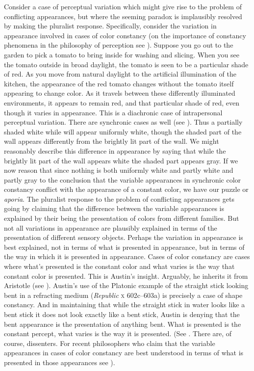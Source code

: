 \documentclass[12pt]{article}
\begin{document}
Consider a case of perceptual variation which might give rise to the problem of conflicting appearances, but where the seeming paradox is implausibly resolved by making the pluralist response. Specifically, consider the variation in appearance involved in cases of color constancy (on the importance of constancy phenomena in the philosophy of perception see \citealt{smith02,Burge:2010uq}). Suppose you go out to the garden to pick a tomato to bring inside for washing and slicing. When you see the tomato outside in broad daylight, the tomato is seen to be a particular shade of red. As you move from natural daylight to the artificial illumination of the kitchen, the appearance of the red tomato changes without the tomato itself appearing to change color. As it travels between these differently illuminated environments, it appears to remain red, and that particular shade of red, even though it varies in appearance. This is a diachronic case of intrapersonal perceptual variation. There are synchronic cases as well (see \citealt{Cohen:2008hc}). Thus a partially shaded white while will appear uniformly white, though the shaded part of the wall appears differently from the brightly lit part of the wall. We might reasonably describe this difference in appearance by saying that while the brightly lit part of the wall appears white the shaded part appears gray. If we now reason that since nothing is both uniformly white and partly white and partly gray to the conclusion that the variable appearances in synchronic color constancy conflict with the appearance of a constant color, we have our puzzle or \emph{aporia}. The pluralist response to the problem of conflicting appearances gets going by claiming that the difference between the variable appearances is explained by their being the presentation of colors from different families. But not all variations in appearance are plausibly explained in terms of the presentation of different sensory objects. Perhaps the variation in appearance is best explained, not in terms of what is presented in appearance, but in terms of the way in which it is presented in appearance. Cases of color constancy are cases where what's presented is the constant color and what varies is the way that constant color is presented. This is Austin's \citeyearpar{Austin:1962lr} insight. Arguably, he inherits it from Aristotle (see \citealt{Kalderon:2015fr}). Austin's use of the Platonic example of the straight stick looking bent in a refracting medium (\emph{Republic} \textsc{x} 602c--603a) is precisely a case of shape constancy. And in maintaining that while the straight stick in water looks like a bent stick it does not look exactly like a bent stick, Austin is denying that the bent appearance is the presentation of anything bent. What is presented is the constant percept, what varies is the way it is presented. (See \citealt{Chisholm:1957dq,Kalderon:2010fj}. There are, of course, dissenters. For recent philosophers who claim that the variable appearances in cases of color constancy are best understood in terms of what is presented in those appearances see \citealt{Noe:2004fk,Chalmers:2006kx}).
\end{document}
